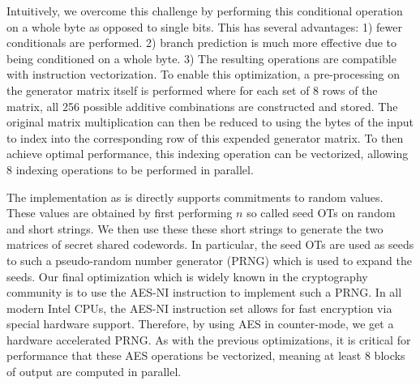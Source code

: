 Intuitively, we overcome this challenge by performing this conditional operation on a whole byte as opposed to single bits. This has several advantages: 1) fewer conditionals are performed. 2) branch prediction is much more effective due to being conditioned on a whole byte.  3) The resulting operations are compatible with instruction vectorization. To enable this optimization, a pre-processing on the generator matrix itself is performed where for each set of 8 rows of the matrix, all 256 possible additive combinations are constructed and stored. The original matrix multiplication can then be reduced to using the bytes of the input to index into the corresponding row of this expended generator matrix. To then achieve optimal performance, this indexing operation can be vectorized, allowing 8 indexing operations to be performed in parallel.

The implementation as is directly supports commitments to random values. These values are obtained by first performing $n$ so called seed OTs on random and short strings. We then use these these short strings to generate the two matrices of secret shared codewords. In particular, the seed OTs are used as seeds to such a pseudo-random number generator (PRNG) which is used to expand the seeds. Our final optimization which is widely known in the cryptography community is to use the AES-NI instruction to implement such a PRNG. In all modern Intel CPUs, the AES-NI instruction set allows for fast encryption via special hardware support. Therefore, by using AES in counter-mode, we get a hardware accelerated PRNG. As with the previous optimizations, it is critical for performance that these AES operations be vectorized, meaning at least 8 blocks of output are computed in parallel.

